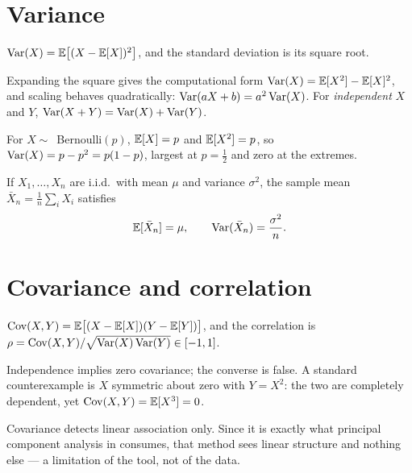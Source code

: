 \section{Variance}

\begin{definition}
\(\operatorname{Var}(X)=\mathbb{E}\bigl[(X-\mathbb{E}[X])^{2}\bigr]\), and the standard deviation is its
square root.
\end{definition}

Expanding the square gives the computational form
\(\operatorname{Var}(X)=\mathbb{E}[X^{2}]-\mathbb{E}[X]^{2}\), and scaling behaves quadratically:
\(\operatorname{Var}(aX+b)=a^{2}\operatorname{Var}(X)\). For \emph{independent} \(X\) and \(Y\),
\(\operatorname{Var}(X+Y)=\operatorname{Var}(X)+\operatorname{Var}(Y)\).

\begin{example}
For \(X\sim\)~Bernoulli\((p)\), \(\mathbb{E}[X]=p\) and \(\mathbb{E}[X^{2}]=p\), so
\(\operatorname{Var}(X)=p-p^{2}=p(1-p)\), largest at \(p=\tfrac12\) and zero at the extremes.
\end{example}

\begin{proposition}
If \(X_1,\ldots,X_n\) are i.i.d.\ with mean \(\mu\) and variance
\(\sigma^{2}\), the sample mean \(\bar X_n=\frac1n\sum_iX_i\) satisfies
\[
	\mathbb{E}[\bar X_n]=\mu,
	\qquad
	\operatorname{Var}(\bar X_n)=\frac{\sigma^{2}}{n}.
\]
\end{proposition}


\section{Covariance and correlation}

\begin{definition}
\(\operatorname{Cov}(X,Y)=\mathbb{E}\bigl[(X-\mathbb{E}[X])(Y-\mathbb{E}[Y])\bigr]\), and the correlation is
\(\rho=\operatorname{Cov}(X,Y)/\sqrt{\operatorname{Var}(X)\operatorname{Var}(Y)}\in[-1,1]\).
\end{definition}

Independence implies zero covariance; the converse is false. A standard
counterexample is \(X\) symmetric about zero with \(Y=X^{2}\): the two are
completely dependent, yet \(\operatorname{Cov}(X,Y)=\mathbb{E}[X^{3}]=0\).

\begin{remark}
Covariance detects linear association only. Since it is exactly what principal
component analysis in  consumes, that method sees linear structure
and nothing else --- a limitation of the tool, not of the data.
\end{remark}

